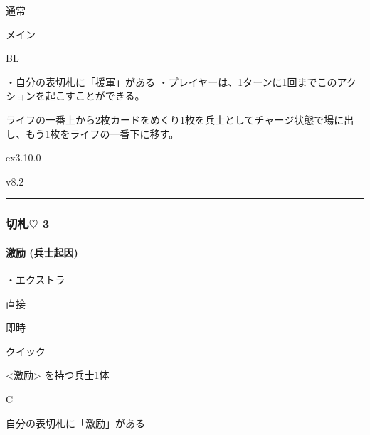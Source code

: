 \documentclass[letterpaper,10pt,dvipdfmx]{sphinxmanual}
\begin{document}
\sphinxAtStartPar
{} 通常

\sphinxAtStartPar
{} メイン

\sphinxAtStartPar
{} BL

\sphinxAtStartPar
{}

\sphinxAtStartPar
・自分の表切札に「援軍」がある
・プレイヤーは、1ターンに1回までこのアクションを起こすことができる。

\sphinxAtStartPar
{}

\sphinxAtStartPar
ライフの一番上から2枚カードをめくり1枚を兵士としてチャージ状態で場に出し、もう1枚をライフの一番下に移す。

\sphinxAtStartPar
{}  ex3.10.0

\sphinxAtStartPar
{}  v8.2


\bigskip\hrule\bigskip



\subsubsection{切札{\normalsize $\heartsuit$} 3}
\label{\detokenize{auto/frameActionlist:id33}}

\paragraph{激励 (兵士起因)}
\label{\detokenize{auto/frameActionlist:act-rally}}\label{\detokenize{auto/frameActionlist:id34}}
\sphinxAtStartPar
{}

\sphinxAtStartPar
・エクストラ

\sphinxAtStartPar
{} 直接

\sphinxAtStartPar
{} 即時

\sphinxAtStartPar
{} クイック

\sphinxAtStartPar
{} \textless{}激励\textgreater{} を持つ兵士1体

\sphinxAtStartPar
{} C

\sphinxAtStartPar
{}

\sphinxAtStartPar
自分の表切札に「激励」がある

\sphinxAtStartPar
{}
\end{document}
